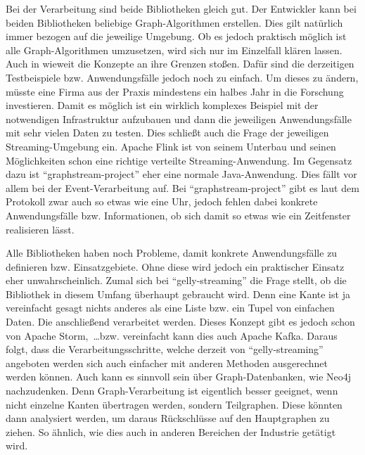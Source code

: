 Bei der Verarbeitung sind beide Bibliotheken gleich gut. Der Entwickler kann bei
beiden Bibliotheken beliebige Graph-Algorithmen erstellen. Dies gilt natürlich
immer bezogen auf die jeweilige Umgebung. Ob es jedoch praktisch möglich ist
alle Graph-Algorithmen umzusetzen, wird sich nur im Einzelfall klären lassen.
Auch in wieweit die Konzepte an ihre Grenzen stoßen. Dafür sind die derzeitigen
Testbeispiele bzw. Anwendungsfälle jedoch noch zu einfach. Um dieses zu ändern,
müsste eine Firma aus der Praxis mindestens ein halbes Jahr in die Forschung
investieren. Damit es möglich ist ein wirklich komplexes Beispiel mit der
notwendigen Infrastruktur aufzubauen und dann die jeweiligen Anwendungsfälle
mit sehr vielen Daten zu testen. Dies schließt auch die Frage der jeweiligen
Streaming-Umgebung ein. Apache Flink ist von seinem Unterbau und seinen
Möglichkeiten schon eine richtige verteilte Streaming-Anwendung. Im Gegensatz
dazu ist \enquote{graphstream-project} eher eine normale Java-Anwendung. Dies
fällt vor allem bei der Event-Verarbeitung auf. Bei \enquote{graphstream-project}
gibt es laut dem Protokoll zwar auch so etwas wie eine Uhr, jedoch fehlen dabei
konkrete Anwendungsfälle bzw. Informationen, ob sich damit so etwas wie ein
Zeitfenster realisieren lässt.

Alle Bibliotheken haben noch Probleme, damit konkrete Anwendungsfälle zu
definieren bzw. Einsatzgebiete. Ohne diese wird jedoch ein praktischer Einsatz
eher unwahrscheinlich. Zumal sich bei \enquote{gelly-streaming} die Frage stellt,
ob die Bibliothek in diesem Umfang überhaupt gebraucht wird. Denn eine Kante
ist ja vereinfacht gesagt nichts anderes als eine Liste bzw. ein Tupel von
einfachen Daten. Die anschließend verarbeitet werden. Dieses Konzept gibt es
jedoch schon von Apache Storm,~\dots bzw. vereinfacht kann dies auch Apache Kafka.
Daraus folgt, dass die Verarbeitungsschritte, welche derzeit von
\enquote{gelly-streaming} angeboten werden sich auch einfacher mit anderen
Methoden ausgerechnet werden können. Auch kann es sinnvoll sein über
Graph-Datenbanken, wie Neo4j nachzudenken. Denn Graph-Verarbeitung ist eigentlich
besser geeignet, wenn nicht einzelne Kanten übertragen werden, sondern
Teilgraphen. Diese könnten dann analysiert werden, um daraus Rückschlüsse auf
den Hauptgraphen zu ziehen. So ähnlich, wie dies auch in anderen Bereichen
der Industrie getätigt wird.
